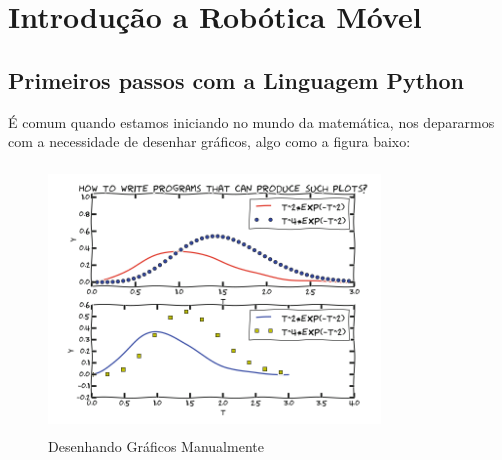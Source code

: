 
\chapter{Introdução a Robótica Móvel}




\section{Primeiros passos com a Linguagem Python}\label{python}

É comum quando estamos iniciando no mundo da matemática, nos depararmos com a necessidade de desenhar gráficos, algo como a figura baixo:

\begin{figure}
    \includegraphics[width=250pt, height=200pt]{chapters/chapter0/figures/manual_graph.png}
    \caption[Desenhando Gráficos Manualmente]{Desenhando Gráficos Manualmente}
\end{figure}

